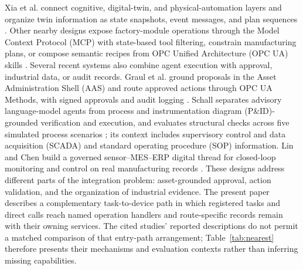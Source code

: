 Xia et al. connect cognitive, digital-twin, and physical-automation layers and
organize twin information as state snapshots, event messages, and plan
sequences \cite{xia2025architecture}. Other nearby designs expose factory-module
operations through the Model Context Protocol (MCP) with state-based tool
filtering, constrain
manufacturing plans, or compose semantic recipes from OPC Unified Architecture
(OPC UA) skills
\cite{koehle2026llmdriven,silva2025mcpmanufacturing,koehle2025semanticrecipes}.
Several recent systems also combine agent execution with approval, industrial
data, or audit records. Graul et al. ground proposals in the Asset
Administration Shell (AAS) and route approved actions through OPC UA Methods,
with signed approvals and audit logging \cite{graul2026aas}. Schall separates
advisory language-model agents from process and instrumentation diagram
(P\&ID)-grounded verification and execution, and evaluates structural checks
across five simulated process scenarios \cite{schall2026safe}; its context
includes supervisory control and data acquisition (SCADA) and standard
operating procedure (SOP) information. Lin and Chen build a governed
sensor--MES--ERP digital thread for closed-loop monitoring and control on real
manufacturing records \cite{lin2026agentic}. These designs address different
parts of the integration problem: asset-grounded approval, action validation,
and the organization of industrial evidence. The present paper describes a
complementary task-to-device path in which registered tasks and direct calls
reach named operation handlers and route-specific records remain with their
owning services. The cited studies' reported descriptions do not permit a
matched comparison of that entry-path arrangement; Table~\ref{tab:nearest}
therefore presents their mechanisms and evaluation contexts rather than
inferring missing capabilities.
